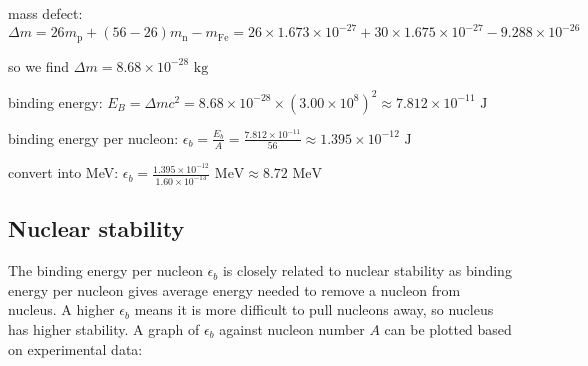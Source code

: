 \begin{soln} mass defect: $\Delta m = 26m_\text{p} + (56-26)m_\text{n} - m_\text{Fe} = 26\times 1.673\times10^{-27} + 30 \times1.675\times10^{-27} - 9.288 \times 10^{-26}$

so we find $\Delta m = 8.68 \times 10^{-28} \text{ kg}$

binding energy: $E_B = \Delta m c^2 = 8.68 \times 10^{-28} \times (3.00\times10^8)^2 \approx 7.812 \times 10^{-11} \text{ J}$

binding energy per nucleon: $\epsilon_b = \frac{E_b}{A} = \frac{7.812 \times 10^{-11}}{56} \approx 1.395 \times 10^{-12} \text{ J}$

\eqyskip convert into MeV: $\epsilon_b = \frac{1.395 \times 10^{-12}}{1.60\times10^{-13}} \text{ MeV} \approx 8.72 \text{ MeV}$ \end{soln}





\subsection{Nuclear stability}

The binding energy per nucleon $\epsilon_b$ is closely related to nuclear stability as binding energy per nucleon gives average energy needed to remove a nucleon from nucleus. A higher $\epsilon_b$ means it is more difficult to pull nucleons away, so nucleus has higher stability. A graph of $\epsilon_b$ against nucleon number $A$ can be plotted based on experimental data:

